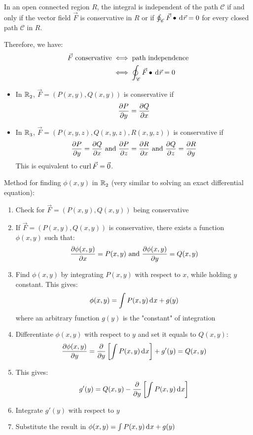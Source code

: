 \documentclass[10pt, twocolumn]{article}
\theoremstyle{remark}
\begin{document}
In an open connected region \(R\), the integral is independent of the path \(\mathscr{C}\) if and only if the vector field \(\vec{F}\) is conservative in \(R\) or if \(\oint_{\mathscr{C}}{\vec{F} \bullet \,\mathrm{d}^{} \vec{r}} = 0\) for every closed path \(\mathscr{C}\) in \(R\).

Therefore, we have:
\begin{align*}
  \vec{F} \text{ conservative} & \iff \text{path independence}                                   \\
                               & \iff \oint_{\mathscr{C}}{\vec{F} \bullet \,\mathrm{d}^{} \vec{r}} = 0
\end{align*}
\begin{itemize}
  \item In \(\mathbb{R}_{2}^{}\), \(\vec{F} = \left( P(x, y), Q(x, y) \right)\) is conservative if
        \[
          \frac{\partial P}{\partial y} = \frac{\partial Q}{\partial x}
        \]
  \item In \(\mathbb{R}_{3}^{}\), \(\vec{F} = \left( P(x, y, z), Q(x, y, z), R(x, y, z) \right)\) is conservative if
        \[
          \frac{\partial P}{\partial y} = \frac{\partial Q}{\partial x} \text{ and } \frac{\partial P}{\partial z} = \frac{\partial R}{\partial x}  \text{ and }\frac{\partial Q}{\partial z} = \frac{\partial R}{\partial y}
        \]
        This is equivalent to \(\mathrm{curl}\,\vec{F} = \vec{0}\).
\end{itemize}


Method for finding \(\phi(x, y)\) in \(\mathbb{R}_{2}^{}\) (very similar to solving an exact differential equation):
\begin{enumerate}
  \item Check for \(\vec{F} = \left( P(x, y), Q(x, y) \right)\) being conservative
  \item If \(\vec{F} = \left( P(x, y), Q(x, y) \right)\) is conservative, there exists a function \(\phi(x,y)\) such that:
        \[
          \frac{\partial \phi(x, y)}{\partial x} = P(x,y) \text{ and } \frac{\partial \phi(x, y)}{\partial y} = Q(x,y)
        \]
  \item Find \(\phi(x,y)\) by integrating \(P(x,y)\) with respect to \(x\), while holding \(y\) constant.
        This gives:
        \[
          \phi(x,y) = \int{P(x,y)\,\mathrm{d}^{} x} + g(y)
        \]
        where an arbitrary function \(g(y)\) is the "constant" of integration
  \item Differentiate \(\phi(x,y)\) with respect to \(y\) and set it equals to \(Q(x,y)\):
        \[
          \frac{\partial \phi(x, y)}{\partial y} = \frac{\partial }{\partial y}\left[ \int{P(x,y)\,\mathrm{d}^{} x} \right] + g'(y) = Q(x,y)
        \]
  \item This gives:
        \[
          g'(y) = Q(x,y) - \frac{\partial }{\partial y}\left[ \int{P(x,y)\,\mathrm{d}^{} x} \right]
        \]
  \item Integrate \(g'(y)\) with respect to \(y\)
  \item Substitute the result in \(\phi(x,y) = \int{P(x,y)\,\mathrm{d}^{} x} + g(y)\)
\end{enumerate}
\end{document}
